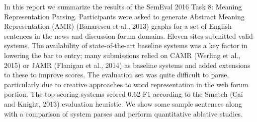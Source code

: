 In this report we summarize the results of the SemEval 2016 Task 8: Meaning Representation Parsing. Participants were asked to generate Abstract Meaning Representation (AMR) (Banarescu et al., 2013) graphs for a set of English sentences in the news and discussion forum domains. Eleven sites submitted valid systems. The availability of state-of-the-art baseline systems was a key factor in lowering the bar to entry; many submissions relied on CAMR (Werling et al., 2015) or JAMR  (Flanigan et al., 2014) as baseline systems and added extensions to these to improve scores. The evaluation set was quite difficult to parse, particularly due to creative approaches to word representation in the web forum portion. The top scoring systems scored 0.62 F1 according to the Smatch (Cai and Knight, 2013) evaluation heuristic. We show some sample sentences along with a comparison of system parses and perform quantitative ablative studies.
